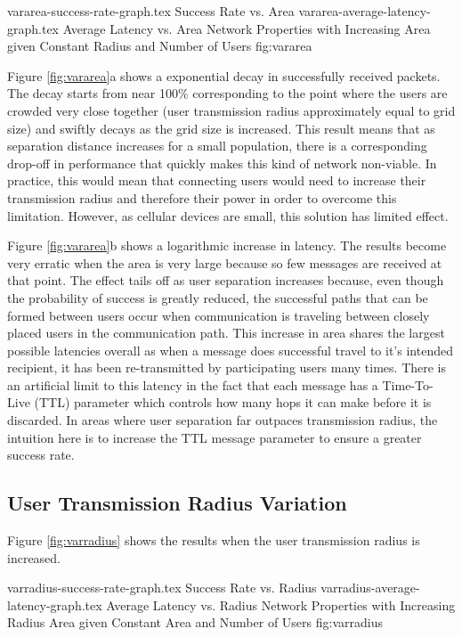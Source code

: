 \sidebysidefigures
{vararea-success-rate-graph.tex}       {Success Rate vs. Area}
{vararea-average-latency-graph.tex}    {Average Latency vs. Area}
{Network Properties with Increasing Area given Constant Radius and Number of Users}
{fig:vararea}

Figure \ref{fig:vararea}a shows a exponential decay in successfully received packets.
The decay starts from near 100\% corresponding to the point where the users are crowded very close
together (user transmission radius approximately equal to grid size) and swiftly decays as
the grid size is increased.
This result means that as separation distance increases for a small population, there
is a corresponding drop-off in performance that quickly makes this kind of network non-viable.
In practice, this would mean that connecting users would need to increase their transmission radius
and therefore their power in order to overcome this limitation.
However, as cellular devices are small, this solution has limited effect.

Figure \ref{fig:vararea}b shows a logarithmic increase in latency.
The results become very erratic when the area is very large because so few messages
are received at that point.
The effect tails off as user separation increases because, even though the probability
of success is greatly reduced, the successful paths that can be formed between users
occur when communication is traveling between closely placed users in the communication path.
This increase in area shares the largest possible latencies overall as when a message does
successful travel to it's intended recipient, it has been re-transmitted by participating
users many times.
There is an artificial limit to this latency in the fact that each message has a Time-To-Live (TTL)
parameter which controls how many hops it can make before it is discarded.
In areas where user separation far outpaces transmission radius, the intuition here is to
increase the TTL message parameter to ensure a greater success rate.

\subsection{User Transmission Radius Variation}
Figure \ref{fig:varradius} shows the results when the user transmission radius is increased.

\sidebysidefigures
{varradius-success-rate-graph.tex}     {Success Rate vs. Radius}
{varradius-average-latency-graph.tex}  {Average Latency vs. Radius}
{Network Properties with Increasing Radius Area given Constant Area and Number of Users}
{fig:varradius}

